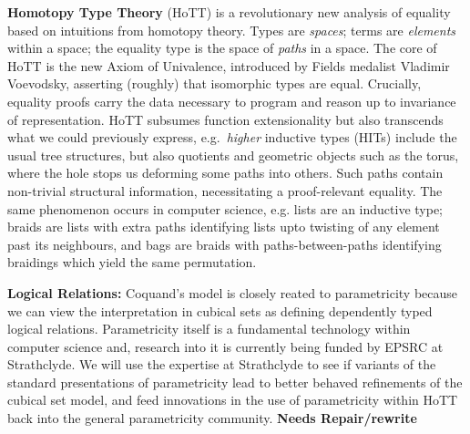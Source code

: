 \documentclass[a4paper,11pt]{article}
\begin{document}
{\bf Homotopy Type Theory} (HoTT) is a revolutionary new analysis of
equality based on intuitions from homotopy theory. Types are
\emph{spaces}; terms are \emph{elements} within a space; the equality
type is the space of \emph{paths} in a space. The core of HoTT is the
new Axiom of Univalence, introduced by Fields medalist Vladimir
Voevodsky, asserting (roughly) that isomorphic types are
equal. Crucially, equality proofs carry the data necessary to program
and reason up to invariance of representation. HoTT subsumes function
extensionality but also transcends what we could previously express,
e.g.\ \emph{higher} inductive types (HITs) include the usual tree
structures, but also quotients \cite{alti:mpc04} and geometric objects such as the
torus, where the hole stops us deforming some paths into others. Such
paths contain non-trivial structural information, necessitating a
proof-relevant equality. The same phenomenon occurs in computer
science, e.g. lists are an inductive type; braids are lists with extra
paths identifying lists upto twisting of any element past its
neighbours, and bags are braids with paths-between-paths identifying
braidings which yield the same permutation.

{\bf Logical Relations:} Coquand's model is closely reated to
parametricity because we can view the interpretation in cubical sets
as defining dependently typed logical relations.
Parametricity
itself is a fundamental technology within computer science and,
research into it is currently being funded by EPSRC at Strathclyde. We
will use the expertise at Strathclyde to see if variants of the
standard presentations of parametricity lead to better behaved
refinements of the cubical set model, and feed innovations in the use
of parametricity within HoTT back into the general parametricity
community. {\bf Needs Repair/rewrite}



\end{document}

